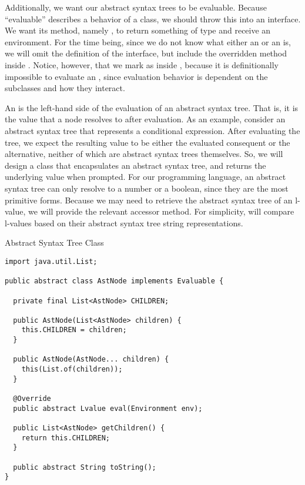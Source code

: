 Additionally, we want our abstract syntax trees to be evaluable. Because ``evaluable'' describes a behavior of a class, we should throw this into an interface. We want its method, namely , to return something of type  and receive an environment. For the time being, since we do not know what either an  or an  is, we will omit the definition of the interface, but include the overridden method inside . Notice, however, that we mark  as  inside , because it is definitionally impossible to evaluate an , since evaluation behavior is dependent on the subclasses and how they interact.

An  is the left-hand side of the evaluation of an abstract syntax tree. That is, it is the value that a node resolves to after evaluation. As an example, consider an abstract syntax tree that represents a conditional expression. After evaluating the tree, we expect the resulting value to be either the evaluated consequent or the alternative, neither of which are abstract syntax trees themselves. So, we will design a class that encapsulates an abstract syntax tree, and returns the underlying value when prompted. For our programming language, an abstract syntax tree can only resolve to a number or a boolean, since they are the most primitive forms. Because we may need to retrieve the abstract syntax tree of an l-value, we will provide the relevant accessor method. For simplicity, will compare l-values based on their abstract syntax tree string representations.

\begin{cl}[]{Abstract Syntax Tree Class}
\begin{lstlisting}[language=MyJava]
import java.util.List;

public abstract class AstNode implements Evaluable {

  private final List<AstNode> CHILDREN;  
 
  public AstNode(List<AstNode> children) { 
    this.CHILDREN = children; 
  }

  public AstNode(AstNode... children) { 
    this(List.of(children)); 
  }

  @Override
  public abstract Lvalue eval(Environment env);

  public List<AstNode> getChildren() { 
    return this.CHILDREN; 
  }

  public abstract String toString();
}
\end{lstlisting}
\end{cl}

